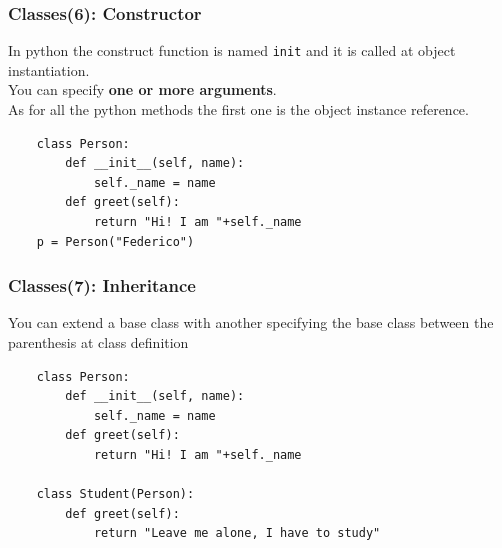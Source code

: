 \documentclass{beamer}
\newcommand{\pyfuncname}[2]{\texttt{\textunderscore\textunderscore#1\textunderscore\textunderscore#2}}
\begin{document}
\begin{frame}[fragile]
    \frametitle{Classes(6): Constructor}
    In python the construct function is named \pyfuncname{init}{} and it is called at object instantiation.\\
    You can specify \textbf{one or more arguments}.\\
    As for all the python methods the first one is the object instance reference.\\
    \begin{verbatim}
    class Person:
        def __init__(self, name):
            self._name = name
        def greet(self):
            return "Hi! I am "+self._name
    p = Person("Federico")
    \end{verbatim}
\end{frame}

\begin{frame}[fragile]
    \frametitle{Classes(7): Inheritance}
    You can extend a base class with another specifying the base class between the parenthesis at class definition
    \begin{verbatim}
    class Person:
        def __init__(self, name):
            self._name = name
        def greet(self):
            return "Hi! I am "+self._name
    
    class Student(Person):
        def greet(self):
            return "Leave me alone, I have to study"
    \end{verbatim}
\end{frame}
\end{document}
